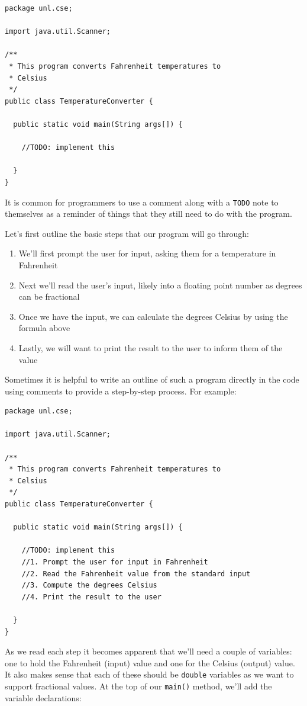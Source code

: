 \begin{verbatim}
package unl.cse;

import java.util.Scanner;

/**
 * This program converts Fahrenheit temperatures to 
 * Celsius
 */
public class TemperatureConverter {

  public static void main(String args[]) {

    //TODO: implement this

  }
}
\end{verbatim}

It is common for programmers to use a comment along with a 
\texttt{TODO} note to themselves as a reminder of things 
that they still need to do with the program.  

Let's first outline the basic steps that our program will go through:
\begin{enumerate}
  \item We'll first prompt the user for input, asking them for a temperature in Fahrenheit
  \item Next we'll read the user's input, likely into a floating point number as degrees can be fractional
  \item Once we have the input, we can calculate the degrees Celsius by using the formula above
  \item Lastly, we will want to print the result to the user to inform them of the value
\end{enumerate}
Sometimes it is helpful to write an outline of such a program directly in the code using
comments to provide a step-by-step process.  For example:

\begin{verbatim}
package unl.cse;

import java.util.Scanner;

/**
 * This program converts Fahrenheit temperatures to 
 * Celsius
 */
public class TemperatureConverter {

  public static void main(String args[]) {

    //TODO: implement this
    //1. Prompt the user for input in Fahrenheit
    //2. Read the Fahrenheit value from the standard input
    //3. Compute the degrees Celsius
    //4. Print the result to the user

  }
}
\end{verbatim}

As we read each step it becomes apparent that we'll need a couple of variables:
one to hold the Fahrenheit (input) value and one for the Celsius (output) value.  It also
makes sense that each of these should be \texttt{double} variables as we
want to support fractional values.  At the top of our \texttt{main()} method, 
we'll add the variable declarations:


